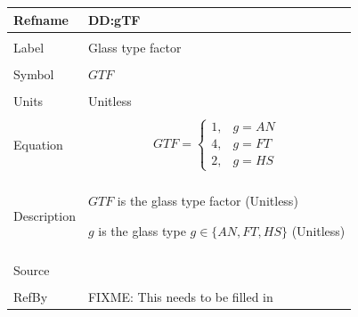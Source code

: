 \documentclass[12pt]{article}
\begin{document}
\noindent \begin{minipage}{\textwidth}
\begin{tabular}{p{} p{}}
\toprule \textbf{Refname} & \textbf{DD:gTF}
\label{DD:gTF}
\\ \midrule \\
Label & Glass type factor
\\ \midrule \\
Symbol & $GTF$
\\ \midrule \\
Units & Unitless
\\ \midrule \\
Equation & \begin{dmath}
           GTF=\begin{cases}
1, & g=AN\\
4, & g=FT\\
2, & g=HS
\end{cases}
           \end{dmath}
\\ \midrule \\
Description & \begin{symbDescription}
              \item{$GTF$ is the glass type factor (Unitless)}
              \item{$g$ is the glass type $g\in{}\{AN,FT,HS\}$ (Unitless)}
              \end{symbDescription}
\\ \midrule \\
Source & 
\\ \midrule \\
RefBy & FIXME: This needs to be filled in
\\ \bottomrule \end{tabular}
\end{minipage}\\
~\newline
\end{document}
